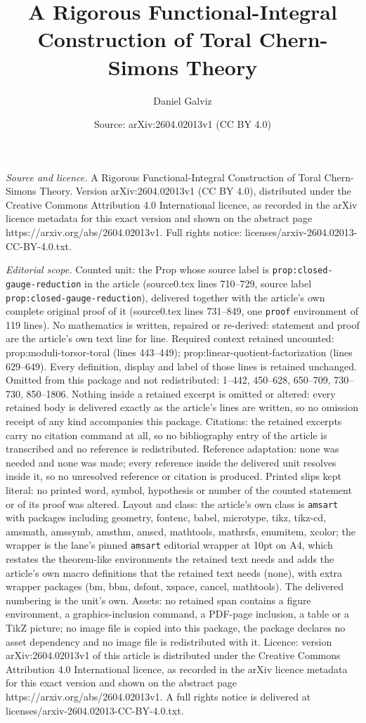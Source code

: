 \documentclass[10pt,a4paper]{amsart}
\title[A Rigorous Functional-Integral Construction of Toral Chern-S]{A Rigorous Functional-Integral Construction of Toral Chern-Simons Theory}
\author{Daniel Galviz}
\date{Source: arXiv:2604.02013v1 (CC BY 4.0)}
\begin{document}
\maketitle

\noindent\emph{Source and licence.} A Rigorous Functional-Integral Construction of Toral Chern-Simons Theory. Version arXiv:2604.02013v1 (CC BY 4.0), distributed under the Creative Commons Attribution 4.0 International licence, as recorded in the arXiv licence metadata for this exact version and shown on the abstract page https://arxiv.org/abs/2604.02013v1. Full rights notice: licenses/arxiv-2604.02013-CC-BY-4.0.txt.\par\smallskip

\noindent\textit{Editorial scope.} Counted unit: the Prop whose source label is \texttt{prop:closed-gauge-reduction} in the article (source0.tex lines 710--729, source label \texttt{prop:closed-gauge-reduction}), delivered together with the article's own complete original proof of it (source0.tex lines 731--849, one \texttt{proof} environment of 119 lines). No mathematics is written, repaired or re-derived: statement and proof are the article's own text line for line. Required context retained uncounted: prop:moduli-torsor-toral (lines 443--449); prop:linear-quotient-factorization (lines 629--649). Every definition, display and label of those lines is retained unchanged. Omitted from this package and not redistributed: 1--442, 450--628, 650--709, 730--730, 850--1806. Nothing inside a retained excerpt is omitted or altered: every retained body is delivered exactly as the article's lines are written, so no omission receipt of any kind accompanies this package. Citations: the retained excerpts carry no citation command at all, so no bibliography entry of the article is transcribed and no reference is redistributed. Reference adaptation: none was needed and none was made; every reference inside the delivered unit resolves inside it, so no unresolved reference or citation is produced. Printed slips kept literal: no printed word, symbol, hypothesis or number of the counted statement or of its proof was altered. Layout and class: the article's own class is \texttt{amsart} with packages including geometry, fontenc, babel, microtype, tikz, tikz-cd, amsmath, amssymb, amsthm, amscd, mathtools, mathrsfs, enumitem, xcolor; the wrapper is the lane's pinned \texttt{amsart} editorial wrapper at 10pt on A4, which restates the theorem-like environments the retained text needs and adds the article's own macro definitions that the retained text needs (none), with extra wrapper packages (bm, bbm, dsfont, xspace, cancel, mathtools). The delivered numbering is the unit's own. Assets: no retained span contains a figure environment, a graphics-inclusion command, a PDF-page inclusion, a table or a TikZ picture; no image file is copied into this package, the package declares no asset dependency and no image file is redistributed with it. Licence: version arXiv:2604.02013v1 of this article is distributed under the Creative Commons Attribution 4.0 International licence, as recorded in the arXiv licence metadata for this exact version and shown on the abstract page https://arxiv.org/abs/2604.02013v1. A full rights notice is delivered at licenses/arxiv-2604.02013-CC-BY-4.0.txt. 
\end{document}
